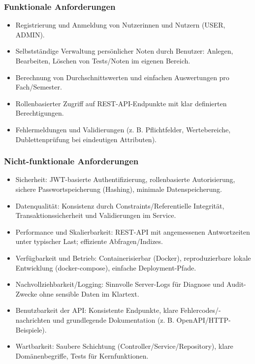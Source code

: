 \documentclass[12pt,a4paper]{article}
\begin{document}
    \subsubsection{Funktionale Anforderungen}
    \begin{itemize}
        \item Registrierung und Anmeldung von Nutzerinnen und Nutzern (USER, ADMIN).
        \item Selbstständige Verwaltung persönlicher Noten durch Benutzer: Anlegen, Bearbeiten, Löschen von Tests/Noten im eigenen Bereich.
        \item Berechnung von Durchschnittswerten und einfachen Auswertungen pro Fach/Semester.
        \item Rollenbasierter Zugriff auf REST-API-Endpunkte mit klar definierten Berechtigungen.
        \item Fehlermeldungen und Validierungen (z. B. Pflichtfelder, Wertebereiche, Dublettenprüfung bei eindeutigen Attributen).
    \end{itemize}

    \subsubsection{Nicht-funktionale Anforderungen}
    \begin{itemize}
        \item Sicherheit: JWT-basierte Authentifizierung, rollenbasierte Autorisierung, sichere Passwortspeicherung (Hashing), minimale Datenspeicherung.
        \item Datenqualität: Konsistenz durch Constraints/Referentielle Integrität, Transaktionssicherheit und Validierungen im Service.
        \item Performance und Skalierbarkeit: REST-API mit angemessenen Antwortzeiten unter typischer Last; effiziente Abfragen/Indizes.
        \item Verfügbarkeit und Betrieb: Containerisierbar (Docker), reproduzierbare lokale Entwicklung (docker-compose), einfache Deployment-Pfade.
        \item Nachvollziehbarkeit/Logging: Sinnvolle Server-Logs für Diagnose und Audit-Zwecke ohne sensible Daten im Klartext.
        \item Benutzbarkeit der API: Konsistente Endpunkte, klare Fehlercodes/-nachrichten und grundlegende Dokumentation (z. B. OpenAPI/HTTP-Beispiele).
        \item Wartbarkeit: Saubere Schichtung (Controller/Service/Repository), klare Domänenbegriffe, Tests für Kernfunktionen.
    \end{itemize}
\end{document}
